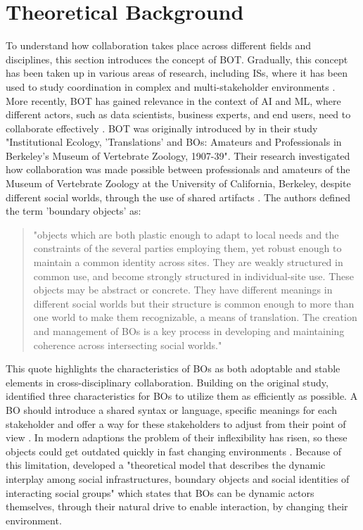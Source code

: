 \documentclass[12pt,oneside]{article}
\begin{document}
\section{Theoretical Background} \label{theoretical-background}

To understand how collaboration takes place across different fields and disciplines, this section introduces the concept of \ac{BOT}. Gradually, this concept has been taken up in various areas of research, including \ac{IS}s, where it has been used to study coordination in complex and multi-stakeholder environments \citep[26]{fominykh2016boundary}. More recently, \ac{BOT} has gained relevance in the context of \ac{AI} and \ac{ML}, where different actors, such as data scientists, business experts, and end users, need to collaborate effectively \citep[12]{rahlmeier2024bridging}. \newline
\ac{BOT} was originally introduced by \citet[388]{star1989institutional} in their study "Institutional Ecology, 'Translations' and \ac{BO}s: Amateurs and Professionals in Berkeley's Museum of Vertebrate Zoology, 1907-39". Their research investigated how collaboration was made possible between professionals and amateurs of the Museum of Vertebrate Zoology at the University of California, Berkeley, despite different social worlds, through the use of shared artifacts \citep[388]{star1989institutional}. The authors defined the term 'boundary objects' as:
\begin{quote}
"objects which are both plastic enough to adapt to local needs and the constraints of the several parties employing them, yet robust enough to maintain a common identity across sites. They are weakly structured in common use, and become strongly structured in individual-site use. These objects may be abstract or concrete. They have different meanings in different social worlds but their structure is common enough to more than one world to make them recognizable, a means of translation. The creation and management of \ac{BO}s is a key process in developing and maintaining coherence across intersecting social worlds." \citep[393]{star1989institutional}
\end{quote}
This quote highlights the characteristics of \ac{BO}s as both adoptable and stable elements in cross-disciplinary collaboration. \newline
Building on the original study, \citet[451]{carlile2002pragmatic} identified three characteristics for \ac{BO}s to utilize them as efficiently as possible. A \ac{BO} should introduce a shared syntax or language, specific meanings for each stakeholder and offer a way for these stakeholders to adjust from their point of view \citep[451-452]{carlile2002pragmatic}. In modern adaptions the problem of their inflexibility has risen, so these objects could get outdated quickly in fast changing environments \citep[196]{gal2008dynamics}. Because of this limitation, \citet[198-199]{gal2008dynamics} developed a "theoretical model that describes the dynamic interplay among social infrastructures, boundary objects and social identities of interacting social groups" which states that \ac{BO}s can be dynamic actors themselves, through their natural drive to enable interaction, by changing their environment. 
\end{document}
